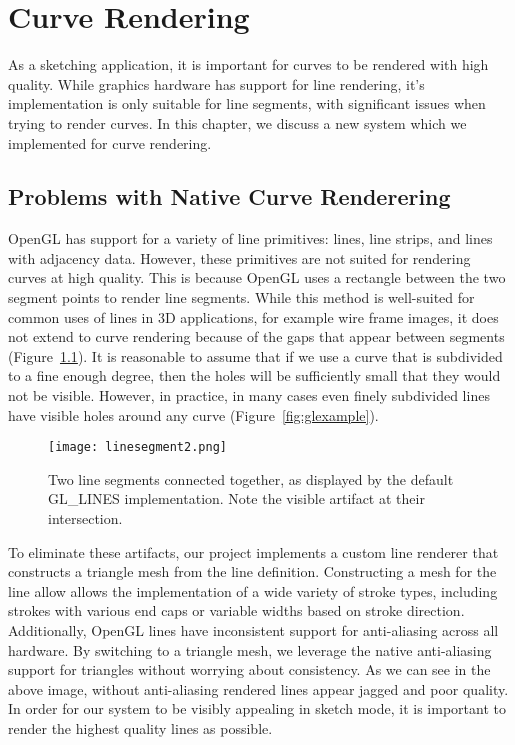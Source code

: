 \chapter{Curve Rendering}

As a sketching application, it is important for curves to be rendered with high quality.
While graphics hardware has support for line rendering, it's implementation is only suitable for line segments, with significant issues when trying to render curves.
In this chapter, we discuss a new system which we implemented for curve rendering.

\section{Problems with Native Curve Renderering}
OpenGL has support for a variety of line primitives: lines, line strips, and lines with adjacency data.
However, these primitives are not suited for rendering curves at high quality.
This is because OpenGL uses a rectangle between the two segment points to render line segments.
While this method is well-suited for common uses of lines in 3D applications, for example wire frame images, it does not extend to curve rendering because of the gaps that appear between segments (Figure~\ref{fig:gllineartifact}).
It is reasonable to assume that if we use a curve that is subdivided to a fine enough degree, then the holes will be sufficiently small that they would not be visible.
However, in practice, in many cases even finely subdivided lines have visible holes around any curve (Figure~\ref{fig:glexample}). 

\begin{figure}
\label{fig:gllineartifact}
	\texttt{[image: linesegment2.png]}
	\caption[Artifacts with GL\_LINES]{Two line segments connected together, as displayed by the default GL\_LINES implementation. Note the visible artifact at their intersection.}
\end{figure}

To eliminate these artifacts, our project implements a custom line renderer that constructs a triangle mesh from the line definition.
Constructing a mesh for the line allow allows the implementation of a wide variety of stroke types, including strokes with various end caps or variable widths based on stroke direction. 
Additionally, OpenGL lines have inconsistent support for anti-aliasing across all hardware.
By switching to a triangle mesh, we leverage the native anti-aliasing support for triangles without worrying about consistency.
As we can see in the above image, without anti-aliasing rendered lines appear jagged and poor quality.
In order for our system to be visibly appealing in sketch mode, it is important to render the highest quality lines as possible.

